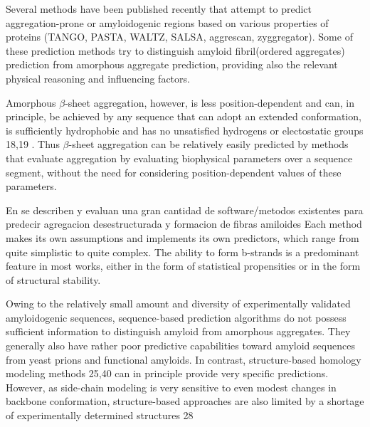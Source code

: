 
Several methods have been published recently that attempt to predict aggregation-prone or amyloidogenic regions based on various properties of proteins (TANGO, PASTA, WALTZ, SALSA, aggrescan, zyggregator).
Some of these prediction methods try to distinguish amyloid fibril(ordered aggregates) prediction from amorphous aggregate prediction, providing also the relevant physical reasoning and influencing factors.

Amorphous $\beta$-sheet aggregation, however, is less position-dependent and can, in principle, be achieved by any sequence that
can adopt an extended conformation, is sufficiently hydrophobic and has no unsatisfied hydrogens or electostatic groups 18,19 . Thus
$\beta$-sheet aggregation can be relatively easily predicted by methods that evaluate aggregation by evaluating biophysical parameters
over a sequence segment, without the need for considering position-dependent values of these parameters.


En  \cite{hamodrakas2011protein,redler2014computational,agrawal2011aggregation} se describen y evaluan una gran cantidad de software/metodos existentes para predecir agregacion desestructurada y formacion de fibras amiloides
Each method makes its own assumptions and implements its own predictors, which range from quite simplistic to quite complex. 
The ability to form b-strands is a predominant feature in most works, either in the form of statistical propensities or in the form of structural stability.



Owing to the relatively small amount
and diversity of experimentally validated amyloidogenic sequences,
sequence-based prediction algorithms do not possess sufficient
information to distinguish amyloid from amorphous aggregates.
They generally also have rather poor predictive capabilities toward
amyloid sequences from yeast prions and functional amyloids. In
contrast, structure-based homology modeling methods 25,40 can in
principle provide very specific predictions. However, as side-chain
modeling is very sensitive to even modest changes in backbone
conformation, structure-based approaches are also limited by a
shortage of experimentally determined structures 28







